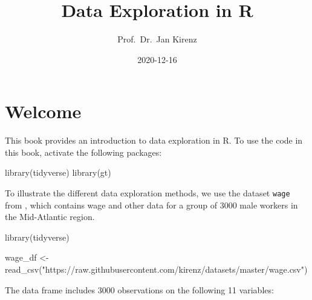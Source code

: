 \documentclass[
]{book}
\title{Data Exploration in R}
\author{Prof.~Dr.~Jan Kirenz}
\date{2020-12-16}
\newenvironment{Shaded}{\begin{snugshade}}{\end{snugshade}}
\newcommand{\FunctionTok}[1]{\textcolor[rgb]{0.00,0.00,0.00}{#1}}
\newcommand{\NormalTok}[1]{#1}
\newcommand{\OtherTok}[1]{\textcolor[rgb]{0.56,0.35,0.01}{#1}}
\newcommand{\StringTok}[1]{\textcolor[rgb]{0.31,0.60,0.02}{#1}}
\begin{document}
\maketitle

{
\setcounter{tocdepth}{1}
\tableofcontents
}
\hypertarget{welcome}{%
\chapter*{Welcome}\label{welcome}}

This book provides an introduction to data exploration in R. To use the code in this book, activate the following packages:

\begin{Shaded}
\begin{Highlighting}[]
\FunctionTok{library}\NormalTok{(tidyverse)}
\FunctionTok{library}\NormalTok{(gt)}
\end{Highlighting}
\end{Shaded}

To illustrate the different data exploration methods, we use the dataset \texttt{wage} from \citet{James2000}, which contains wage and other data for a group of 3000 male workers in the Mid-Atlantic region.

\begin{Shaded}
\begin{Highlighting}[]
\FunctionTok{library}\NormalTok{(tidyverse)}

\NormalTok{wage\_df }\OtherTok{\textless{}{-}} \FunctionTok{read\_csv}\NormalTok{(}\StringTok{"https://raw.githubusercontent.com/kirenz/datasets/master/wage.csv"}\NormalTok{)}
\end{Highlighting}
\end{Shaded}

The data frame includes 3000 observations on the following 11 variables:
\end{document}
